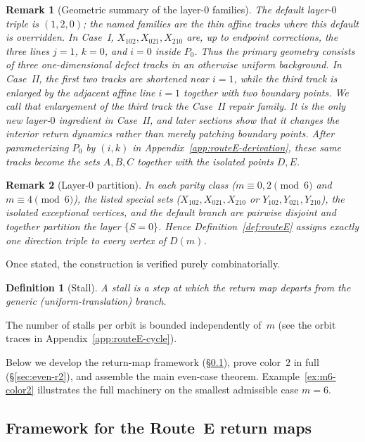 \documentclass[11pt]{article}
\newtheorem{definition}{Definition}
\newtheorem{remark}{Remark}
\begin{document}
\begin{remark}[Geometric summary of the layer-$0$ families]\label{rem:routeE-layer0-geometry}
The default layer-$0$ triple is $(1,2,0)$; the named families are the thin affine tracks where this default is overridden.
In Case~I, $X_{102},X_{021},X_{210}$ are, up to endpoint corrections, the three lines $j=1$, $k=0$, and $i=0$ inside $P_0$.
Thus the primary geometry consists of three one-dimensional defect tracks in an otherwise uniform background.
In Case~II, the first two tracks are shortened near $i=1$, while the third track is enlarged by the adjacent affine line $i=1$ together with two boundary points.
We call that enlargement of the third track the \emph{Case~II repair family}.
It is the only new layer-$0$ ingredient in Case~II, and later sections show that it changes the interior return dynamics rather than merely patching boundary points.
After parameterizing $P_0$ by $(i,k)$ in Appendix~\ref{app:routeE-derivation}, these same tracks become the sets $A,B,C$ together with the isolated points $D,E$.
\end{remark}

\begin{remark}[Layer-$0$ partition]\label{rem:layer0-partition}
In each parity class ($m\equiv 0,2\pmod 6$ and $m\equiv 4\pmod 6$), the listed special sets ($X_{102},X_{021},X_{210}$ or $Y_{102},Y_{021},Y_{210}$), the isolated exceptional vertices, and the default branch are pairwise disjoint and together partition the layer $\{S=0\}$.
Hence Definition~\ref{def:routeE} assigns exactly one direction triple to every vertex of $D(m)$.
\end{remark}

Once stated, the construction is verified purely combinatorially.

\begin{definition}[Stall]\label{def:stall}
A \emph{stall} is a step at which the return map departs from the generic (uniform-translation) branch.
\end{definition}

\noindent
The number of stalls per orbit is bounded independently of~$m$ (see the orbit traces in Appendix~\ref{app:routeE-cycle}).

Below we develop the return-map framework (\S\ref{sec:framework}), prove color~$2$ in full (\S\ref{sec:even-r2}), and assemble the main even-case theorem.
Example~\ref{ex:m6-color2} illustrates the full machinery on the smallest admissible case $m=6$.

\subsection{Framework for the Route~E return maps}\label{sec:framework}
\end{document}
